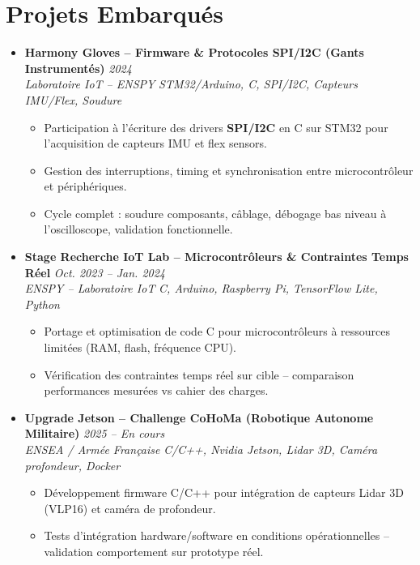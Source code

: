 \documentclass[a4paper,11pt]{article}
\begin{document}
\section{Projets Embarqués}
\begin{itemize}[leftmargin=*, label={-}]

\item \textbf{Harmony Gloves -- Firmware \& Protocoles SPI/I2C (Gants Instrumentés)} \hfill \textit{2024} \\
\textit{Laboratoire IoT -- ENSPY} \hfill \textit{STM32/Arduino, C, SPI/I2C, Capteurs IMU/Flex, Soudure}
\vspace{-2pt}
    \begin{itemize}[leftmargin=0.4cm, nosep, label=\tiny$\bullet$]
        \item \small{Participation à l'écriture des drivers \textbf{SPI/I2C} en C sur STM32 pour l'acquisition de capteurs IMU et flex sensors.}
        \item \small{Gestion des interruptions, timing et synchronisation entre microcontrôleur et périphériques.}
        \item \small{Cycle complet : soudure composants, câblage, débogage bas niveau à l'oscilloscope, validation fonctionnelle.}
    \end{itemize}
\vspace{3pt}

\item \textbf{Stage Recherche IoT Lab -- Microcontrôleurs \& Contraintes Temps Réel} \hfill \textit{Oct. 2023 -- Jan. 2024} \\
\textit{ENSPY -- Laboratoire IoT} \hfill \textit{C, Arduino, Raspberry Pi, TensorFlow Lite, Python}
\vspace{-2pt}
    \begin{itemize}[leftmargin=0.4cm, nosep, label=\tiny$\bullet$]
        \item \small{Portage et optimisation de code C pour microcontrôleurs à ressources limitées (RAM, flash, fréquence CPU).}
        \item \small{Vérification des contraintes temps réel sur cible -- comparaison performances mesurées vs cahier des charges.}
    \end{itemize}
\vspace{3pt}

\item \textbf{Upgrade Jetson -- Challenge CoHoMa (Robotique Autonome Militaire)} \hfill \textit{2025 -- En cours} \\
\textit{ENSEA / Armée Française} \hfill \textit{C/C++, Nvidia Jetson, Lidar 3D, Caméra profondeur, Docker}
\vspace{-2pt}
    \begin{itemize}[leftmargin=0.4cm, nosep, label=\tiny$\bullet$]
        \item \small{Développement firmware C/C++ pour intégration de capteurs Lidar 3D (VLP16) et caméra de profondeur.}
        \item \small{Tests d'intégration hardware/software en conditions opérationnelles -- validation comportement sur prototype réel.}
    \end{itemize}
\vspace{3pt}


\end{itemize}
\end{document}
